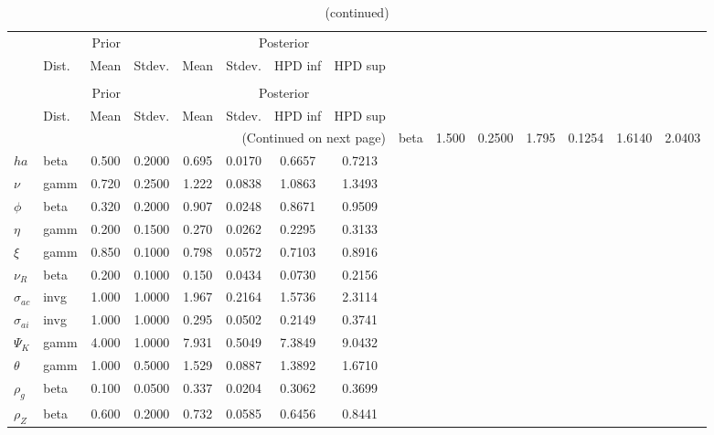  
\begin{center}
\begin{longtable}{llcccccc} 
\caption{Results from Metropolis-Hastings (parameters)}
 \label{Table:MHPosterior:1}\\
\toprule 
  & \multicolumn{3}{c}{Prior}  &  \multicolumn{4}{c}{Posterior} \\
  \cmidrule(r{.75em}){2-4} \cmidrule(r{.75em}){5-8}
  & Dist. & Mean  & Stdev. & Mean & Stdev. & HPD inf & HPD sup\\
\midrule \endfirsthead 
\caption{(continued)}\\\toprule 
  & \multicolumn{3}{c}{Prior}  &  \multicolumn{4}{c}{Posterior} \\
  \cmidrule(r{.75em}){2-4} \cmidrule(r{.75em}){5-8}
  & Dist. & Mean  & Stdev. & Mean & Stdev. & HPD inf & HPD sup\\
\midrule \endhead 
\bottomrule \multicolumn{8}{r}{(Continued on next page)} \endfoot 
\bottomrule \endlastfoot 
${\sigma}$ & beta &   1.500 & 0.2500 &   1.795& 0.1254 &  1.6140 &  2.0403 \\ 
${ha}$ & beta &   0.500 & 0.2000 &   0.695& 0.0170 &  0.6657 &  0.7213 \\ 
$\nu$ & gamm &   0.720 & 0.2500 &   1.222& 0.0838 &  1.0863 &  1.3493 \\ 
${\phi}$ & beta &   0.320 & 0.2000 &   0.907& 0.0248 &  0.8671 &  0.9509 \\ 
${\eta}$ & gamm &   0.200 & 0.1500 &   0.270& 0.0262 &  0.2295 &  0.3133 \\ 
$\xi$ & gamm &   0.850 & 0.1000 &   0.798& 0.0572 &  0.7103 &  0.8916 \\ 
${\nu_R}$ & beta &   0.200 & 0.1000 &   0.150& 0.0434 &  0.0730 &  0.2156 \\ 
${\sigma_{ac}}$ & invg &   1.000 & 1.0000 &   1.967& 0.2164 &  1.5736 &  2.3114 \\ 
${\sigma_{ai}}$ & invg &   1.000 & 1.0000 &   0.295& 0.0502 &  0.2149 &  0.3741 \\ 
${\Psi_{K}}$ & gamm &   4.000 & 1.0000 &   7.931& 0.5049 &  7.3849 &  9.0432 \\ 
${\theta}$ & gamm &   1.000 & 0.5000 &   1.529& 0.0887 &  1.3892 &  1.6710 \\ 
${\rho_g}$ & beta &   0.100 & 0.0500 &   0.337& 0.0204 &  0.3062 &  0.3699 \\ 
${\rho_Z}$ & beta &   0.600 & 0.2000 &   0.732& 0.0585 &  0.6456 &  0.8441 \\ 

\end{longtable}
\end{center}

